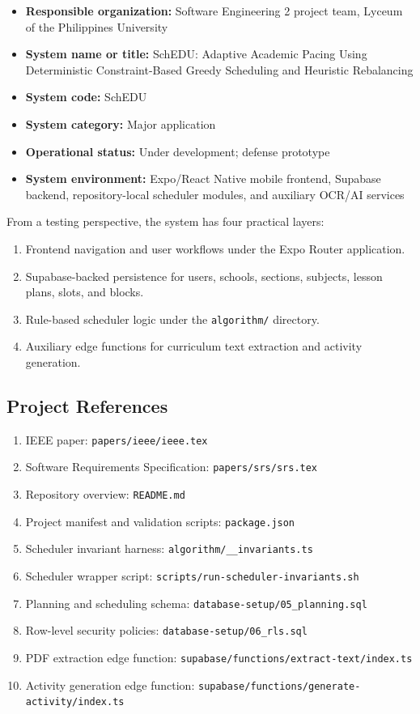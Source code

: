 \documentclass[12pt]{article}
\begin{document}
\begin{itemize}
    \item \textbf{Responsible organization:} Software Engineering 2 project team, Lyceum of the Philippines University
    \item \textbf{System name or title:} SchEDU: Adaptive Academic Pacing Using Deterministic Constraint-Based Greedy Scheduling and Heuristic Rebalancing
    \item \textbf{System code:} SchEDU
    \item \textbf{System category:} Major application
    \item \textbf{Operational status:} Under development; defense prototype
    \item \textbf{System environment:} Expo/React Native mobile frontend, Supabase backend, repository-local scheduler modules, and auxiliary OCR/AI services
\end{itemize}

From a testing perspective, the system has four practical layers:
\begin{enumerate}
    \item Frontend navigation and user workflows under the Expo Router application.
    \item Supabase-backed persistence for users, schools, sections, subjects, lesson plans, slots, and blocks.
    \item Rule-based scheduler logic under the \nolinkurl{algorithm/} directory.
    \item Auxiliary edge functions for curriculum text extraction and activity generation.
\end{enumerate}

\subsection{Project References}

\begin{enumerate}
    \item IEEE paper: \nolinkurl{papers/ieee/ieee.tex}
    \item Software Requirements Specification: \nolinkurl{papers/srs/srs.tex}
    \item Repository overview: \nolinkurl{README.md}
    \item Project manifest and validation scripts: \nolinkurl{package.json}
    \item Scheduler invariant harness: \nolinkurl{algorithm/__invariants.ts}
    \item Scheduler wrapper script: \nolinkurl{scripts/run-scheduler-invariants.sh}
    \item Planning and scheduling schema: \nolinkurl{database-setup/05_planning.sql}
    \item Row-level security policies: \nolinkurl{database-setup/06_rls.sql}
    \item PDF extraction edge function: \nolinkurl{supabase/functions/extract-text/index.ts}
    \item Activity generation edge function: \nolinkurl{supabase/functions/generate-activity/index.ts}
\end{enumerate}
\end{document}
